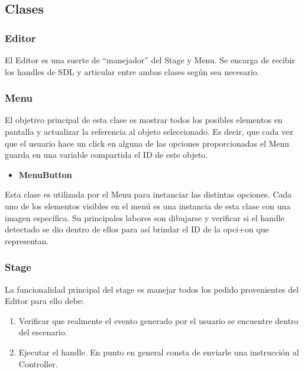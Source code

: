 \documentclass[a4paper]{article}
\begin{document}
\subsection{Clases}

\subsubsection{Editor}

El Editor es una suerte de “manejador” del Stage y Menu. Se encarga de recibir los handles de SDL y articular entre ambas clases según sea necesario.

\subsubsection{Menu}

El objetivo principal de esta clase es mostrar todos los posibles elementos en pantalla y actualizar la referencia al objeto seleccionado. Es decir, que cada vez que el usuario hace un click en alguna de las opciones proporcionadas el Menu guarda en una variable compartida el ID de este objeto.

\begin{itemize}
\item \textbf{MenuButton}
\end{itemize}

Esta clase es utilizada por el Menu para instanciar las distintas opciones. Cada uno de los elementos visibles en el menú es una instancia de esta clase con una imagen específica. Su principales labores son dibujarse y verificar si el handle detectado se dio dentro de ellos para así brindar el ID de la opci+on que representan.

\subsubsection{Stage}

La funcionalidad principal del stage es manejar todos los pedido provenientes del Editor para ello debe:
\begin{enumerate}
\item Verificar que realmente el evento generado por el usuario se encuentre dentro del escenario.
\item Ejecutar el handle. En punto en general consta de enviarle una instrucción al Controller.
\end{enumerate}
\end{document}
